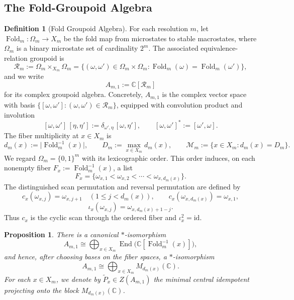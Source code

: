 \documentclass[12pt,a4paper]{article}
\theoremstyle{plain}
\newtheorem{proposition}[theorem]{Proposition}
\theoremstyle{definition}
\newtheorem{definition}[theorem]{Definition}
\numberwithin{equation}{section}
\DeclareMathOperator{\End}{End}
\newcommand{\CC}{\mathbb{C}}
\newcommand{\abs}[1]{\lvert #1\rvert}
\newcommand{\Fold}{\operatorname{Fold}}
\begin{document}
\subsection{The Fold-Groupoid Algebra}
\begin{definition}[Fold Groupoid Algebra]\label{def:fold-equivalence-groupoid-algebra}
For each resolution \(m\), let \(\Fold_m:\Omega_m\to X_m\) be the fold map from microstates to stable macrostates, where \(\Omega_m\) is a binary microstate set of cardinality \(2^m\). The associated equivalence-relation groupoid is
\[
\mathcal R_m:=\Omega_m\times_{X_m}\Omega_m
=
\{(\omega,\omega')\in \Omega_m\times\Omega_m:\Fold_m(\omega)=\Fold_m(\omega')\},
\]
and we write
\[
A_{m,1}:=\CC[\mathcal R_m]
\]
for its complex groupoid algebra. Concretely, \(A_{m,1}\) is the complex vector space with basis \(\{[\omega,\omega']:(\omega,\omega')\in\mathcal R_m\}\), equipped with convolution product and involution
\[
[\omega,\omega']\,[\eta,\eta']
:=
\delta_{\omega',\eta}\,[\omega,\eta'],
\qquad
[\omega,\omega']^\ast:=[\omega',\omega].
\]
The fiber multiplicity at \(x\in X_m\) is
\[
d_m(x):=\abs{\Fold_m^{-1}(x)},
\qquad
D_m:=\max_{x\in X_m}d_m(x),
\qquad
\mathcal M_m:=\{x\in X_m:d_m(x)=D_m\}.
\]
We regard \(\Omega_m=\{0,1\}^m\) with its lexicographic order. This order induces, on each nonempty fiber \(F_x:=\Fold_m^{-1}(x)\), a list
\[
F_x=\{\omega_{x,1}<\omega_{x,2}<\cdots <\omega_{x,d_m(x)}\}.
\]
The distinguished scan permutation and reversal permutation are defined by
\[
c_x(\omega_{x,j})=\omega_{x,j+1}\quad(1\le j<d_m(x)),
\qquad
c_x(\omega_{x,d_m(x)})=\omega_{x,1},
\]
\[
\iota_x(\omega_{x,j})=\omega_{x,d_m(x)+1-j}.
\]
Thus \(c_x\) is the cyclic scan through the ordered fiber and \(\iota_x^2=\mathrm{id}\).
\end{definition}

\begin{proposition}\label{prop:fold-groupoid-wedderburn}
There is a canonical \(\ast\)-isomorphism
\[
A_{m,1}\cong \bigoplus_{x\in X_m}\End\!\bigl(\CC[\Fold_m^{-1}(x)]\bigr),
\]
and hence, after choosing bases on the fiber spaces, a \(\ast\)-isomorphism
\[
A_{m,1}\cong \bigoplus_{x\in X_m}M_{d_m(x)}(\CC).
\]
For each \(x\in X_m\), we denote by \(\widetilde P_x\in Z(A_{m,1})\) the minimal central idempotent projecting onto the block \(M_{d_m(x)}(\CC)\).
\end{proposition}
\end{document}

